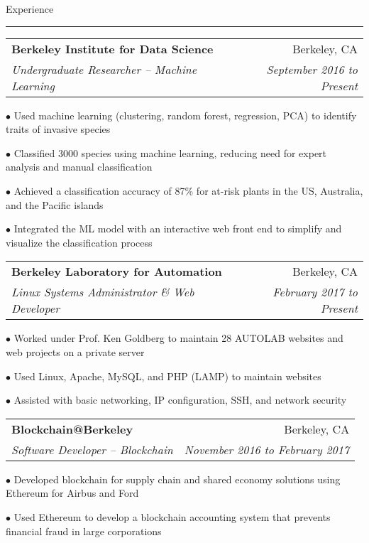 \documentclass[11pt,letterpaper]{article}
\makeatletter
\newcommand{\bulletpoint}{\rule{0cm}{1pt}$\bullet$  }
\newenvironment{topic}[1]
    {
    \large #1
    \vspace*{0.03in}
    \hrule 
    \vspace*{0.05in}
    }
    {}
\newenvironment{event}
    {
    \begin{tabular*}{\textwidth}{l@{\extracolsep{\fill}}r}
    }
    {
    \end{tabular*}
    }
\newenvironment{detail}
    {
    \normalsize
    }
    {
    \vspace*{0.02in}
    }
\makeatother
\begin{document}
    \begin{topic}{Experience}
        \begin{event}
            \textbf{Berkeley Institute for Data Science} & Berkeley, CA \\
            \emph{Undergraduate Researcher -- Machine Learning} & \emph{September 2016 to Present} \\
        \end{event}
            \begin{detail}
                \bulletpoint Used machine learning (clustering, random forest, regression, PCA) to identify traits of invasive species\\
                \bulletpoint Classified 3000 species using machine learning, reducing need for expert analysis and manual classification \\
                \bulletpoint Achieved a classification accuracy of 87\% for at-risk plants in the US, Australia, and the Pacific islands \\
                \bulletpoint Integrated the ML model with an interactive web front end to simplify and visualize the classification process            
            \end{detail}
        \vspace*{-0.1in}

        \begin{event}
            \textbf{Berkeley Laboratory for Automation} & Berkeley, CA \\
            \emph{Linux Systems Administrator \& Web Developer} & \emph{February 2017 to Present}
        \end{event}
            \begin{detail}
                \bulletpoint Worked under Prof. Ken Goldberg to maintain 28 AUTOLAB websites and web projects on a private server
                \bulletpoint Used Linux, Apache, MySQL, and PHP (LAMP) to maintain websites  \\
                \bulletpoint Assisted with basic networking, IP configuration, SSH, and network security
            \end{detail}
        \vspace*{0.1in}

        \begin{event}
            \textbf{Blockchain@Berkeley} & Berkeley, CA \\
            \emph{Software Developer -- Blockchain} & \emph{November 2016 to February 2017}
        \end{event}
            \begin{detail}
                \bulletpoint Developed blockchain for supply chain and shared economy solutions using Ethereum for Airbus and Ford \\
                \bulletpoint Used Ethereum to develop a blockchain accounting system that prevents financial fraud in large corporations
            \end{detail}
        
    \end{topic} \vspace*{-0.1in}
\end{document}
